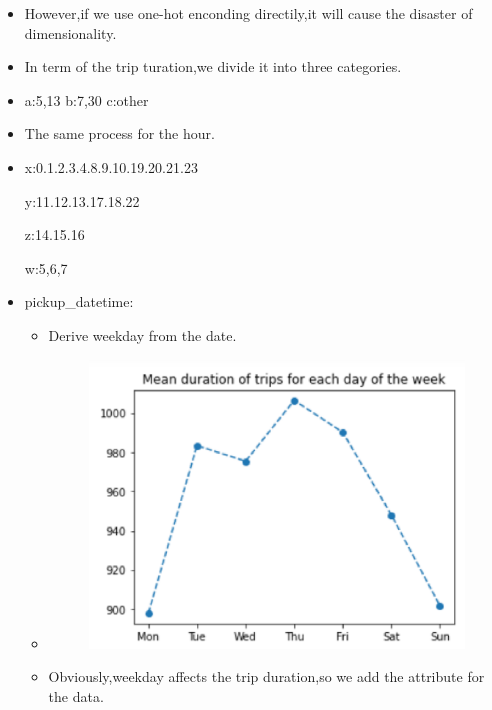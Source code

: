 \documentclass[
 size=14pt,
 paper=smartboard,  %
 mode=present, 		%
 display=slides, 	%
 style=tuliplab,  	%
 pauseslide,
 fleqn,leqno]{powerdot}
\begin{document}
\begin{slide}[toc=,bm=]{}
\begin{itemize}
\begin{itemize}
{\begin{itemize}
          \item However,if we use one-hot enconding directily,it will cause the disaster of dimensionality. 

          \item In term of the trip turation,we divide it into three categories.

          \item a:5,13 \qquad b:7,30  \qquad c:other
          
          \item The same process for the hour.
          \item x:0.1.2.3.4.8.9.10.19.20.21.23 
          
          y:11.12.13.17.18.22
          
          z:14.15.16
          
          w:5,6,7
        \end{itemize}
        }
      \end{itemize}
  \end{itemize}
\end{slide}

\begin{slide}[toc=,bm=]{}
  \begin{itemize}
  \item pickup_datetime:
  \begin{itemize}
    \item Derive weekday from the date.
    \item \begin{figure}\includegraphics[scale=0.4]{figures/13.eps}\end{figure}
    \item Obviously,weekday affects the trip duration,so we add the attribute for the data. 
  \end{itemize}
\end{itemize}
\end{slide}
\end{document}
